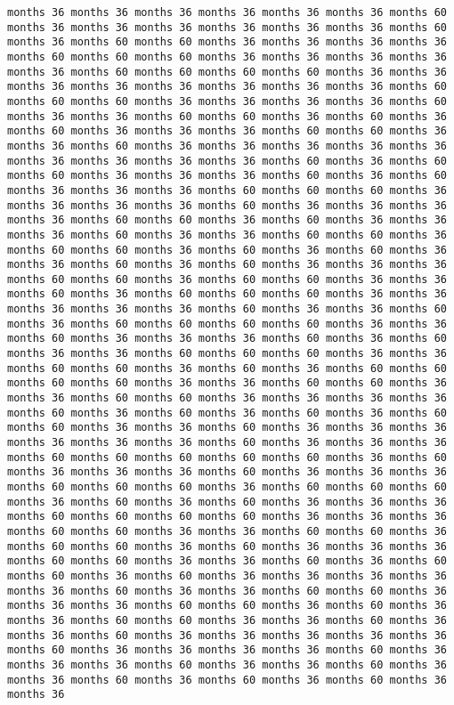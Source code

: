 \documentclass[11pt]{article}
\begin{document}
\begin{Verbatim}[commandchars=\\\{\}, frame=single, framerule=2mm, rulecolor=\color{outerrorbackground}]
months 36 months 36 months 36 months 36 months 36 months 36 months 60 months 36 months 36 months 36 months 36 months 36 months 36 months 60 months 36 months 60 months 60 months 36 months 36 months 36 months 36 months 60 months 60 months 60 months 36 months 36 months 36 months 36 months 36 months 60 months 60 months 60 months 60 months 36 months 36 months 36 months 36 months 36 months 36 months 36 months 36 months 60 months 60 months 60 months 36 months 36 months 36 months 36 months 60 months 36 months 36 months 60 months 60 months 36 months 60 months 36 months 60 months 36 months 36 months 36 months 60 months 60 months 36 months 36 months 60 months 36 months 36 months 36 months 36 months 36 months 36 months 36 months 36 months 36 months 60 months 36 months 60 months 60 months 36 months 36 months 36 months 60 months 36 months 60 months 36 months 36 months 36 months 60 months 60 months 60 months 36 months 36 months 36 months 36 months 60 months 36 months 36 months 36 months 36 months 60 months 60 months 36 months 60 months 36 months 36 months 36 months 60 months 36 months 36 months 60 months 60 months 36 months 60 months 60 months 36 months 60 months 36 months 60 months 36 months 36 months 60 months 36 months 60 months 36 months 36 months 36 months 60 months 60 months 36 months 60 months 60 months 36 months 36 months 60 months 36 months 60 months 60 months 60 months 36 months 36 months 36 months 36 months 36 months 60 months 36 months 36 months 60 months 36 months 60 months 60 months 60 months 60 months 36 months 36 months 60 months 36 months 36 months 36 months 60 months 36 months 60 months 36 months 36 months 60 months 60 months 60 months 36 months 36 months 60 months 60 months 36 months 60 months 36 months 60 months 60 months 60 months 60 months 36 months 36 months 60 months 60 months 36 months 36 months 60 months 60 months 36 months 36 months 36 months 36 months 60 months 36 months 60 months 36 months 60 months 36 months 60 months 60 months 36 months 36 months 60 months 36 months 36 months 36 months 36 months 36 months 36 months 60 months 36 months 36 months 36 months 60 months 60 months 60 months 60 months 60 months 36 months 60 months 36 months 36 months 36 months 60 months 36 months 36 months 36 months 60 months 60 months 60 months 36 months 60 months 60 months 60 months 36 months 60 months 36 months 60 months 36 months 36 months 36 months 60 months 60 months 60 months 60 months 36 months 36 months 36 months 60 months 60 months 36 months 36 months 60 months 60 months 36 months 60 months 60 months 36 months 60 months 36 months 36 months 36 months 60 months 60 months 36 months 36 months 60 months 36 months 60 months 60 months 36 months 60 months 36 months 36 months 36 months 36 months 36 months 60 months 36 months 36 months 60 months 60 months 36 months 36 months 36 months 60 months 60 months 36 months 60 months 36 months 36 months 60 months 60 months 36 months 36 months 60 months 36 months 36 months 60 months 36 months 36 months 36 months 36 months 36 months 60 months 36 months 36 months 36 months 36 months 60 months 36 months 36 months 36 months 60 months 36 months 36 months 60 months 36 months 36 months 60 months 36 months 60 months 36 months 60 months 36 months 36 
\end{Verbatim}
\end{document}
